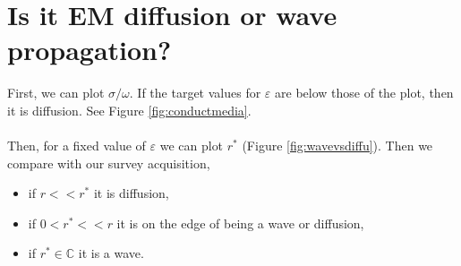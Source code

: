 \documentclass[a4paper,12pt]{article}
\begin{document}
	\section*{Is it EM diffusion or wave propagation?}
	First, we can plot $\sigma/\omega$. If the target values for $\varepsilon$ are below those of the plot, then it is diffusion. See Figure \ref{fig:conductmedia}.
	\\\\
	Then, for a fixed value of $\varepsilon$ we can plot $r^*$ (Figure \ref{fig:wavevsdiffu}). Then we compare with our survey acquisition,
	\begin{itemize}
		\item if $r<<r^*$ it is diffusion,
		\item if $0<r^*<<r$ it is on the edge of being a wave or diffusion,
		\item if $r^*\in\mathbb{C}$ it is a wave.
	\end{itemize}
\end{document}
